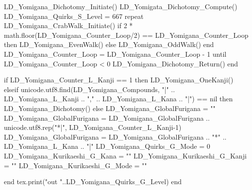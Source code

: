 {			LD_Yomigana_Dichotomy_Initiate()
			LD_Yomigata_Dichotomy_Compute()
			LD_Yomigana_Quirks_S_Level = 667
			repeat
				LD_Yomigana_CrabWalk_Initiate()
				if 2 * math.floor(LD_Yomigana_Counter_Loop/2) == LD_Yomigana_Counter_Loop then
					LD_Yomigana_EvenWalk()
				else
					LD_Yomigana_OddWalk()
				end
				LD_Yomigana_Counter_Loop = LD_Yomigana_Counter_Loop  - 1
			until LD_Yomigana_Counter_Loop < 0			
			LD_Yomigana_Dichotomy_Return()
		end                                                    
	
		if LD_Yomigana_Counter_L_Kanji == 1 then
			LD_Yomigana_OneKanji() %
		elseif  unicode.utf8.find(LD_Yomigana_Compounds, "|" .. LD_Yomigana_L_Kanji .. "," .. LD_Yomigana_L_Kana .. "|") == nil then
			LD_Yomigana_Dichotomy() %
		else %
			LD_Yomigana_GlobalFurigana = ""
			LD_Yomigana_GlobalFurigana = LD_Yomigana_GlobalFurigana .. 	unicode.utf8.rep("*|", LD_Yomigana_Counter_L_Kanji-1)
			LD_Yomigana_GlobalFurigana = LD_Yomigana_GlobalFurigana .. "*" .. 			LD_Yomigana_L_Kana .. "|"
			LD_Yomigana_Quirks_G_Mode = 0
			LD_Yomigana_Kurikaeshi_G_Kana = ""
			LD_Yomigana_Kurikaeshi_G_Kanji = ""
			LD_Yomigana_Kurikaeshi_G_Mode = ""
			
							
		end
			tex.print("out "..LD_Yomigana_Quirks_G_Level)
	end
	
	
	
}
